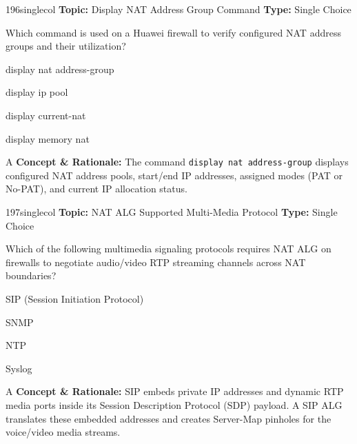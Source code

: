 \begin{qcard}{196}{singlecol}
\textcolor{darkslate!75}{\small\textbf{Topic:} Display NAT Address Group Command \hfill \textbf{Type:} Single Choice}\vspace{0.4em}\par
Which command is used on a Huawei firewall to verify configured NAT address groups and their utilization?
\begin{qoptions}
\item display nat address-group
\item display ip pool
\item display current-nat
\item display memory nat
\end{qoptions}
\end{qcard}
\nopagebreak
\begin{explainbox}{A}
\textbf{Concept \& Rationale:} The command \texttt{display nat address-group} displays configured NAT address pools, start/end IP addresses, assigned modes (PAT or No-PAT), and current IP allocation status.
\end{explainbox}

\begin{qcard}{197}{singlecol}
\textcolor{darkslate!75}{\small\textbf{Topic:} NAT ALG Supported Multi-Media Protocol \hfill \textbf{Type:} Single Choice}\vspace{0.4em}\par
Which of the following multimedia signaling protocols requires NAT ALG on firewalls to negotiate audio/video RTP streaming channels across NAT boundaries?
\begin{qoptions}
\item SIP (Session Initiation Protocol)
\item SNMP
\item NTP
\item Syslog
\end{qoptions}
\end{qcard}
\nopagebreak
\begin{explainbox}{A}
\textbf{Concept \& Rationale:} SIP embeds private IP addresses and dynamic RTP media ports inside its Session Description Protocol (SDP) payload. A SIP ALG translates these embedded addresses and creates Server-Map pinholes for the voice/video media streams.
\end{explainbox}

